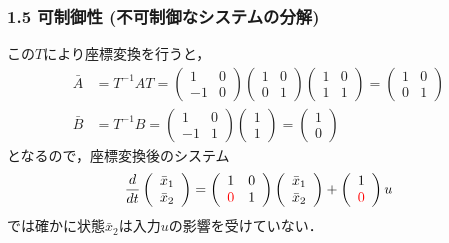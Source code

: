 \begin{frame}[t]
\frametitle{1.5 可制御性 (不可制御なシステムの分解)}
この$T$により座標変換を行うと，
\begin{align}
 \bar{A} &= T^{-1}AT =
 \left(
 \begin{array}{cc}
  1 & 0 \\
  -1 & 0
 \end{array}
 \right)
 \left(
 \begin{array}{cc}
  1 & 0 \\
  0 & 1
 \end{array}
 \right)
 \left(
 \begin{array}{cc}
  1 & 0 \\
  1 & 1
 \end{array}
 \right) =
 \left(
 \begin{array}{cc}
  1 & 0 \\
  0 & 1
 \end{array}
 \right) \\
 \bar{B} &= T^{-1}B =
 \left(
 \begin{array}{cc}
  1 & 0 \\
  -1 & 1
 \end{array}
 \right)
 \left(
 \begin{array}{c}
  1 \\
  1
 \end{array}
 \right) =
 \left(
 \begin{array}{c}
  1 \\
  0
 \end{array}
 \right)
\end{align}
となるので，座標変換後のシステム
\begin{equation}
 \frac{d}{dt}
  \left(
   \begin{array}{c}
    \bar{x}_1 \\
    \bar{x}_2
   \end{array}
  \right) =
  \left(
   \begin{array}{cc}
    1 & 0 \\
    \textcolor{red}{0} & 1
   \end{array}
  \right)
  \left(
   \begin{array}{c}
    \bar{x}_1 \\
    \bar{x}_2
   \end{array}
  \right) +
  \left(
   \begin{array}{c}
    1 \\
    \textcolor{red}{0}
   \end{array}
  \right) u
\end{equation}
では確かに状態$\bar{x}_2$は入力$u$の影響を受けていない．
\end{frame}


